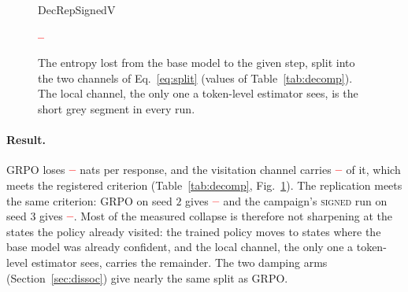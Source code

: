 \documentclass[runningheads]{llncs}
\providecommand{\PENDING}{\textcolor{red}{\textbf{--}}}
\newcommand{\num}[1]{\ifcsname #1\endcsname\csname #1\endcsname\else\PENDING\fi}
\begin{document}
\begin{figure}[t]
\centering
\ifcsname DecRepSignedV\endcsname
{}
\else \PENDING \fi
{}
\caption{The entropy lost from the base model to the given step, split into the two
channels of Eq.~\eqref{eq:split} (values of Table~\ref{tab:decomp}). The local channel,
the only one a token-level estimator sees, is the short grey segment in every run.}
\label{fig:split}
\end{figure}

\paragraph{Result.} GRPO loses $\num{DecGrpoDH}$ nats per response, and the visitation
channel carries $\num{DecGrpoShare}$ of it, which meets the registered criterion
(Table~\ref{tab:decomp}, Fig.~\ref{fig:split}). The replication meets the same criterion: GRPO on seed $2$
gives $\num{DecRepGrpoShare}$ and the campaign's \textsc{signed} run on seed $3$ gives
$\num{DecRepSignedShare}$. Most of the measured collapse is therefore not sharpening at
the states the policy already visited: the trained policy moves to states where the
base model was already confident, and the local channel, the only one a token-level
estimator sees, carries the remainder. The two damping arms (Section~\ref{sec:dissoc})
give nearly the same split as GRPO.
\end{document}
